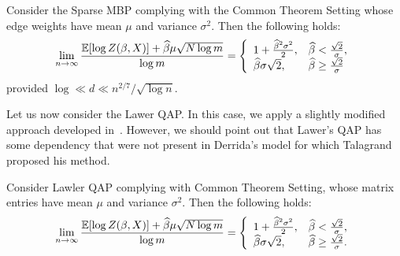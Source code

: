 
\begin{theorem}\label{thm:sparse_mbp_tight_bound}
  Consider the Sparse MBP complying with the Common Theorem Setting whose edge weights
  have mean $\mu$ and variance $\sigma^2$. Then the following holds:
\begin{equation}\label{eq:sparse_mbp_tight_bound}
\lim_{n\to \infty} \frac{{\mathbb{E}}[\log Z(\beta, X)] +\widehat \beta \mu \sqrt{N\log m}}{\log m} =
\left\{ \begin{array}{ll}
1+\frac{\widehat \beta^2\sigma^2}{2}, &
\widehat \beta< \frac{\sqrt{2}}{\sigma},\\
\widehat \beta \sigma \sqrt{2}, & \widehat \beta \ge \frac{\sqrt{2}}{\sigma}
\end{array}
\right.
\end{equation}
provided $\log \ll d \ll n^{2/7}/\sqrt{\log n}$.
\end{theorem}

Let us now consider the Lawer QAP. In this case, we apply a slightly modified
approach developed in~\citeauthor{talagrand03}. However, we should point out that
Lawer's QAP has some dependency that were not present in Derrida's model
for which Talagrand proposed his method. 



\begin{theorem}\label{thm:lawler_qap_tight_bound}
  Consider Lawler QAP complying with Common Theorem Setting, whose matrix
  entries have mean $\mu$ and variance $\sigma^2$. Then the following holds:
\begin{equation}\label{eq:lawler_qap_tight_bound}
\lim_{n\to \infty} \frac{{\mathbb{E}}[\log Z(\beta, X)] +\widehat \beta \mu \sqrt{N\log m}}{\log m} =
\left\{ \begin{array}{ll}
1+\frac{\widehat \beta^2\sigma^2}{2}, &
\widehat \beta< \frac{\sqrt{2}}{\sigma},\\
\widehat \beta \sigma \sqrt{2}, & \widehat \beta \ge \frac{\sqrt{2}}{\sigma}.
\end{array}
\right.
\end{equation}
\end{theorem}

